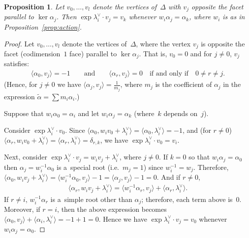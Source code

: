 \documentclass[11pt]{article}
\numberwithin{equation}{section}
\newtheorem{Proposition}[Theorem]{Proposition}
{\theoremstyle{definition}
\newtheorem{Definition}[Theorem]{Definition}
\newtheorem{Example}[Theorem]{Example}
\newtheorem{Remark}[Theorem]{Remark}
}
\begin{document}
\begin{Proposition}
\label{prop:dynk}
Let $v_0, \ldots, v_l$ denote the vertices of~$\Delta$ with $v_j$ opposite the facet parallel to $\ker \alpha_j$.
Then $\exp \lambda_i^\vee \cdot v_j = v_k$ whenever $w_i \alpha_j = \alpha_k$, where $w_i$ is as in
Proposition~{\rm \ref{prop:action}}.
\end{Proposition}
\begin{proof}
Let $v_0, \ldots, v_l$ denote the vertices of~$\Delta$, where the vertex $v_j$ is opposite the facet (codimension~$1$
face) parallel to $\ker \alpha_j$.
That is, $v_0=0$ and for $j\neq 0$, $v_j$ satisf\/ies:
\begin{gather*}
\langle \alpha_0,v_j\rangle = -1
\qquad
\text{and}
\qquad
\langle\alpha_r,v_j\rangle = 0
\quad
\text{if and only if}
\quad
0\neq r\neq j.
\end{gather*}
(Hence, for $j\neq 0$ we have $\langle\alpha_j,v_j\rangle = \frac{1}{m_j}$, where $m_j$ is the coef\/f\/icient of $\alpha_j$
in the expression $\tilde\alpha = \sum m_i\alpha_i$.)

Suppose that $w_i\alpha_0 = \alpha_i$ and let $w_i\alpha_j=\alpha_k$ (where~$k$ depends on~$j$).

Consider $\exp \lambda_i^\vee \cdot v_0$.
Since $\langle \alpha_0,w_i v_0+\lambda_i^\vee\rangle = \langle\alpha_0,\lambda_i^\vee\rangle = -1$, and (for $r\neq 0$)
$\langle \alpha_r,w_iv_0 +\lambda_i^\vee\rangle=\langle\alpha_r,\lambda_i^\vee\rangle = \delta_{r,k}$, we have $\exp
\lambda_i^\vee \cdot v_0 = v_i$.

Next, consider $\exp \lambda_i^\vee \cdot v_j=w_i v_j + \lambda_i^\vee$, where $j\neq 0$.
If $k=0$ so that $w_i\alpha_j=\alpha_0$ then $\alpha_j=w_i^{-1} \alpha_0$ is a~special root (i.e.~$m_j=1$) since
$w_i^{-1}=w_j$.
Therefore, $\langle\alpha_0,w_i v_j+\lambda_i^\vee\rangle = \langle w_i^{-1}\alpha_0,v_j\rangle-1= \langle
\alpha_j,v_j\rangle-1=0$.
And if $r\neq 0$,
\begin{gather}
\label{eq:idvert}
\langle\alpha_r,w_i v_j+\lambda_i^\vee\rangle = \langle w_i^{-1} \alpha_r,v_j\rangle + \langle
\alpha_r,\lambda_i^\vee\rangle.
\end{gather}
If $r\neq i$, $w_i^{-1} \alpha_r$ is a~simple root other than $\alpha_j$; therefore, each term above is~$0$.
Moreover, if $r=i$, then the above expression becomes $\langle \alpha_0,v_j \rangle +
\langle\alpha_i,\lambda_i^\vee\rangle = -1+1=0$.
Hence we have $\exp \lambda_i^\vee \cdot v_j = v_0$ whenever $w_i\alpha_j = \alpha_0$.


\end{proof}
\end{document}
